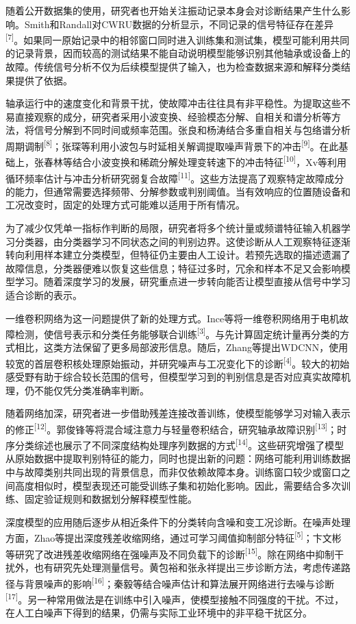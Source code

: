\documentclass[UTF8,12pt,openany,twoside]{ctexbook}
\numberwithin{equation}{chapter}
\begin{document}
随着公开数据集的使用，研究者也开始关注振动记录本身会对诊断结果产生什么影响。Smith和Randall对CWRU数据的分析显示，不同记录的信号特征存在差异\textsuperscript{[7]}。如果同一原始记录中的相邻窗口同时进入训练集和测试集，模型可能利用共同的记录背景，因而较高的测试结果不能自动说明模型能够识别其他轴承或设备上的故障。传统信号分析不仅为后续模型提供了输入，也为检查数据来源和解释分类结果提供了依据。

轴承运行中的速度变化和背景干扰，使故障冲击往往具有非平稳性。为提取这些不易直接观察的成分，研究者采用小波变换、经验模态分解、自相关和谱分析等方法，将信号分解到不同时间或频率范围。张良和杨涛结合多重自相关与包络谱分析周期调制\textsuperscript{[8]}；张琛等利用小波包与时延相关解调提取噪声背景下的冲击\textsuperscript{[9]}。在此基础上，张春林等结合小波变换和稀疏分解处理变转速下的冲击特征\textsuperscript{[10]}，Xv等利用循环频率估计与冲击分析研究弱复合故障\textsuperscript{[11]}。这些方法提高了观察特定故障成分的能力，但通常需要选择频带、分解参数或判别阈值。当有效响应的位置随设备和工况改变时，固定的处理方式可能难以适用于所有情况。

为了减少仅凭单一指标作判断的局限，研究者将多个统计量或频谱特征输入机器学习分类器，由分类器学习不同状态之间的判别边界。这使诊断从人工观察特征逐渐转向利用样本建立分类模型，但特征仍主要由人工设计。若预先选取的描述遗漏了故障信息，分类器便难以恢复这些信息；特征过多时，冗余和样本不足又会影响模型学习。随着深度学习的发展，研究重点进一步转向能否让模型直接从信号中学习适合诊断的表示。

一维卷积网络为这一问题提供了新的处理方式。Ince等将一维卷积网络用于电机故障检测，使信号表示和分类任务能够联合训练\textsuperscript{[3]}。与先计算固定统计量再分类的方式相比，这类方法保留了更多局部波形信息。随后，Zhang等提出WDCNN，使用较宽的首层卷积核处理原始振动，并研究噪声与工况变化下的诊断\textsuperscript{[4]}。较大的初始感受野有助于综合较长范围的信号，但模型学习到的判别信息是否对应真实故障机理，仍不能仅凭分类准确率判断。

随着网络加深，研究者进一步借助残差连接改善训练，使模型能够学习对输入表示的修正\textsuperscript{[12]}。郭俊锋等将混合域注意力与轻量卷积结合，研究轴承故障识别\textsuperscript{[13]}；时序分类综述也展示了不同深度结构处理序列数据的方式\textsuperscript{[14]}。这些研究增强了模型从原始数据中提取判别特征的能力，同时也提出新的问题：网络可能利用训练数据中与故障类别共同出现的背景信息，而非仅依赖故障本身。训练窗口较少或窗口之间高度相似时，模型表现还可能受训练子集和初始化影响。因此，需要结合多次训练、固定验证规则和数据划分解释模型性能。

深度模型的应用随后逐步从相近条件下的分类转向含噪和变工况诊断。在噪声处理方面，Zhao等提出深度残差收缩网络，通过可学习阈值抑制部分特征\textsuperscript{[5]}；卞文彬等研究了改进残差收缩网络在强噪声及不同负载下的诊断\textsuperscript{[15]}。除在网络中抑制干扰外，也有研究先处理测量信号。黄包裕和张永祥提出三步诊断方法，考虑传递路径与背景噪声的影响\textsuperscript{[16]}；秦毅等结合噪声估计和算法展开网络进行去噪与诊断\textsuperscript{[17]}。另一种常用做法是在训练中引入噪声，使模型接触不同强度的干扰。不过，在人工白噪声下得到的结果，仍需与实际工业环境中的非平稳干扰区分。
\end{document}
